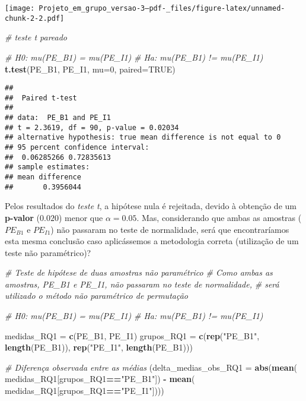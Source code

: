 \documentclass[
]{article}
\newenvironment{Shaded}{\begin{snugshade}}{\end{snugshade}}
\newcommand{\AttributeTok}[1]{\textcolor[rgb]{0.13,0.29,0.53}{#1}}
\newcommand{\CommentTok}[1]{\textcolor[rgb]{0.56,0.35,0.01}{\textit{#1}}}
\newcommand{\ConstantTok}[1]{\textcolor[rgb]{0.56,0.35,0.01}{#1}}
\newcommand{\DecValTok}[1]{\textcolor[rgb]{0.00,0.00,0.81}{#1}}
\newcommand{\FunctionTok}[1]{\textcolor[rgb]{0.13,0.29,0.53}{\textbf{#1}}}
\newcommand{\NormalTok}[1]{#1}
\newcommand{\OtherTok}[1]{\textcolor[rgb]{0.56,0.35,0.01}{#1}}
\newcommand{\SpecialCharTok}[1]{\textcolor[rgb]{0.81,0.36,0.00}{\textbf{#1}}}
\newcommand{\StringTok}[1]{\textcolor[rgb]{0.31,0.60,0.02}{#1}}
\begin{document}
\texttt{[image: Projeto\_em\_grupo\_versao-3--pdf-\_files/figure-latex/unnamed-chunk-2-2.pdf]}

\begin{Shaded}
\begin{Highlighting}[]
\CommentTok{\# teste t pareado}

\CommentTok{\# H0: mu(PE\_B1) = mu(PE\_I1)}
\CommentTok{\# Ha: mu(PE\_B1) != mu(PE\_I1)}
\FunctionTok{t.test}\NormalTok{(PE\_B1, PE\_I1, }\AttributeTok{mu=}\DecValTok{0}\NormalTok{, }\AttributeTok{paired=}\ConstantTok{TRUE}\NormalTok{)}
\end{Highlighting}
\end{Shaded}

\begin{verbatim}
## 
##  Paired t-test
## 
## data:  PE_B1 and PE_I1
## t = 2.3619, df = 90, p-value = 0.02034
## alternative hypothesis: true mean difference is not equal to 0
## 95 percent confidence interval:
##  0.06285266 0.72835613
## sample estimates:
## mean difference 
##       0.3956044
\end{verbatim}

Pelos resultados do \emph{teste t}, a hipótese nula é rejeitada, devido
à obtenção de um \textbf{p-valor} (\(0.020\)) menor que
\(\alpha = 0.05\). Mas, considerando que ambas as amostras (\(PE_{B1}\)
e \(PE_{I1}\)) não passaram no teste de normalidade, será que
encontraríamos esta mesma conclusão caso aplicássemos a metodologia
correta (utilização de um teste não paramétrico)?

\begin{Shaded}
\begin{Highlighting}[]
\CommentTok{\# Teste de hipótese de duas amostras não paramétrico}
\CommentTok{\# Como ambas as amostras, PE\_B1 e PE\_I1, não passaram no teste de normalidade,}
\CommentTok{\# será utilizado o método não paramétrico de permutação}

\CommentTok{\# H0: mu(PE\_B1) = mu(PE\_I1)}
\CommentTok{\# Ha: mu(PE\_B1) != mu(PE\_I1)}

\NormalTok{medidas\_RQ1 }\OtherTok{=} \FunctionTok{c}\NormalTok{(PE\_B1, PE\_I1)}
\NormalTok{grupos\_RQ1 }\OtherTok{=} \FunctionTok{c}\NormalTok{(}\FunctionTok{rep}\NormalTok{(}\StringTok{"PE\_B1"}\NormalTok{, }\FunctionTok{length}\NormalTok{(PE\_B1)), }\FunctionTok{rep}\NormalTok{(}\StringTok{"PE\_I1"}\NormalTok{, }\FunctionTok{length}\NormalTok{(PE\_B1)))}

\CommentTok{\# Diferença observada entre as médias}
\NormalTok{(}\AttributeTok{delta\_medias\_obs\_RQ1 =} \FunctionTok{abs}\NormalTok{(}\FunctionTok{mean}\NormalTok{(}
\NormalTok{    medidas\_RQ1[grupos\_RQ1}\SpecialCharTok{==}\StringTok{"PE\_B1"}\NormalTok{]) }\SpecialCharTok{{-}} \FunctionTok{mean}\NormalTok{(}
\NormalTok{        medidas\_RQ1[grupos\_RQ1}\SpecialCharTok{==}\StringTok{"PE\_I1"}\NormalTok{])))}
\end{Highlighting}
\end{Shaded}
\end{document}
